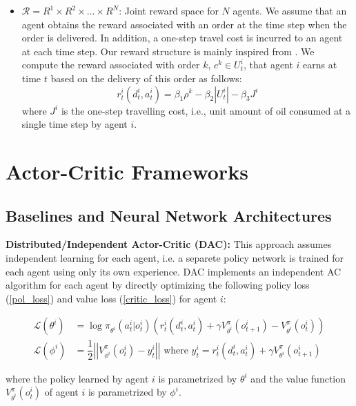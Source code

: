\documentclass{article}
\theoremstyle{defn}
\theoremstyle{prop}
\theoremstyle{assm}
\theoremstyle{theoremm}
\theoremstyle{remarkk}
\theoremstyle{lem}
\theoremstyle{example}
\theoremstyle{example}
\begin{document}
\begin{itemize}[leftmargin=*]
    \item $\mathcal{R} = R^1 \times R^2 \times \ldots \times R^N$: Joint reward space for $N$ agents. We assume that an agent obtains the reward associated with an order at the time step when the order is delivered. In addition, a one-step travel cost is incurred to an agent at each time step. Our reward structure is mainly inspired from \cite{DeepPool}. We compute the reward associated with order $k$, $c^k \in U^i_t$, that agent $i$ earns at time $t$ based on the delivery of this order as follows:
    \begin{equation}
         r^i_t(d_t^i, a^i_t) = \beta_1 \rho^k -\beta_2 |U^i_t| - \beta_3 J^i
    \end{equation} 
    where $J^i$ is the one-step travelling cost, i.e., unit amount of oil consumed at a single time step by agent $i$.
\end{itemize}

\section{Actor-Critic Frameworks}\label{ac}
\subsection{Baselines and Neural Network Architectures}\label{base}

\textbf{Distributed/Independent Actor-Critic (DAC):} This approach assumes independent learning for each agent, i.e. a separete policy network is trained for each agent using only its own experience. DAC implements an independent AC algorithm for each agent by directly optimizing the following policy loss (\ref{pol_loss}) and value loss (\ref{critic_loss}) for agent $i$:

\begin{align}
    \mathcal{L}(\theta^i) &= \log {\pi_{\theta^i}} (a_t^i | o_t^i)(r^i_t(d_t^i, a_t^i) + \gamma V^{\pi}_{\theta^i}(o_{t+1}^i) - V^{\pi}_{\theta^i}(o_{t}^i)) \label{pol_loss} \\
    \mathcal{L}(\phi^i) &= \dfrac{1}{2} \left| \left|V^\pi_{\phi^i} (o_t^i) - y^i_t \right|\right| \text{ where } y^i_t = r^i_t(d_t^i, a_t^i) + \gamma V^{\pi}_{\theta^i}(o_{t+1}^i) \label{critic_loss}
\end{align}

where the policy learned by agent $i$ is parametrized by $\theta^i$ and the value function $V^{\pi}_{\theta^i}(o_{t}^i)$ of agent $i$ is parametrized by $\phi^i$. 
\end{document}
